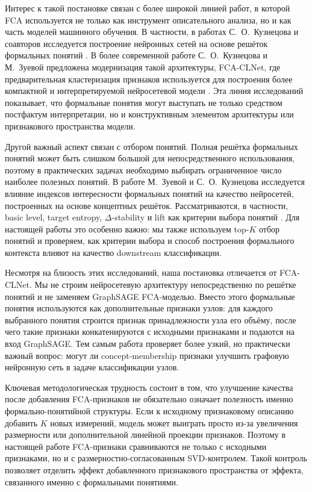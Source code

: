 \documentclass[14pt,a4paper]{extarticle}
\begin{document}
Интерес к такой постановке связан с более широкой линией работ, в которой FCA
используется не только как инструмент описательного анализа, но и как часть
моделей машинного обучения. В частности, в работах С.~О.~Кузнецова и соавторов
исследуется построение нейронных сетей на основе решёток формальных понятий
\cite{kuznetsov2017concept_lattice_nn}. В более современной работе
С.~О.~Кузнецова и М.~Зуевой предложена модернизация такой архитектуры,
FCA-CLNet, где предварительная кластеризация признаков используется для
построения более компактной и интерпретируемой нейросетевой модели
\cite{kuznetsov_zueva_training_nn_concepts}. Эта линия исследований показывает,
что формальные понятия могут выступать не только средством постфактум
интерпретации, но и конструктивным элементом архитектуры или признакового
пространства модели.

Другой важный аспект связан с отбором понятий. Полная решётка формальных понятий
может быть слишком большой для непосредственного использования, поэтому в
практических задачах необходимо выбирать ограниченное число наиболее полезных
понятий. В работе М.~Зуевой и С.~О.~Кузнецова исследуется влияние индексов
интересности формальных понятий на качество нейросетей, построенных на основе
концептных решёток. Рассматриваются, в частности, basic level, target entropy,
$\Delta$-stability и lift как критерии выбора понятий
\cite{zueva_kuznetsov_interestingness_nn}. Для настоящей работы это особенно
важно: мы также используем top-$K$ отбор понятий и проверяем, как критерии
выбора и способ построения формального контекста влияют на качество downstream
классификации.

Несмотря на близость этих исследований, наша постановка отличается от FCA-CLNet.
Мы не строим нейросетевую архитектуру непосредственно по решётке понятий и не
заменяем GraphSAGE FCA-моделью. Вместо этого формальные понятия используются как
дополнительные признаки узлов: для каждого выбранного понятия строится признак
принадлежности узла его объёму, после чего такие признаки конкатенируются с
исходными признаками и подаются на вход GraphSAGE. Тем самым работа проверяет
более узкий, но практически важный вопрос: могут ли concept-membership признаки
улучшить графовую нейронную сеть в задаче классификации узлов.

Ключевая методологическая трудность состоит в том, что улучшение качества после
добавления FCA-признаков не обязательно означает полезность именно
формально-понятийной структуры. Если к исходному признаковому описанию добавить
$K$ новых измерений, модель может выиграть просто из-за увеличения размерности
или дополнительной линейной проекции признаков. Поэтому в настоящей работе
FCA-признаки сравниваются не только с исходными признаками, но и с
размерностно-согласованным SVD-контролем. Такой контроль позволяет отделить
эффект добавленного признакового пространства от эффекта, связанного именно с
формальными понятиями.
\end{document}
